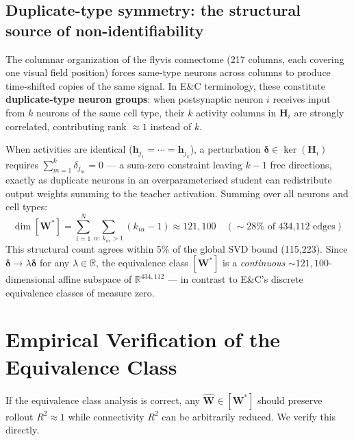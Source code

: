 \documentclass[11pt,a4paper]{article}
\begin{document}
\subsection{Duplicate-type symmetry: the structural source of non-identifiability}
\label{subsec:duplicate}

The columnar organization of the flyvis connectome (217 columns, each covering
one visual field position) forces same-type neurons across columns to produce
time-shifted copies of the same signal. In E\&C terminology, these constitute
\textbf{duplicate-type neuron groups}: when postsynaptic neuron $i$ receives
input from $k$ neurons of the same cell type, their $k$ activity columns in
$\mathbf{H}_i$ are strongly correlated, contributing rank $\approx 1$ instead of
$k$.

When activities are identical ($\mathbf{h}_{j_1} = \cdots = \mathbf{h}_{j_k}$), a
perturbation $\boldsymbol{\delta} \in \ker(\mathbf{H}_i)$ requires
$\sum_{m=1}^{k}\delta_{j_m} = 0$ --- a sum-zero constraint leaving $k-1$ free
directions, exactly as duplicate neurons in an overparameterised student can
redistribute output weights summing to the teacher activation. Summing over all
neurons and cell types:
\begin{equation}
\dim[\mathbf{W}^*] = \sum_{i=1}^{N} \sum_{\alpha:\,k_{i\alpha}>1} (k_{i\alpha}-1)
\approx 121{,}100 \quad (\sim 28\% \text{ of 434,112 edges})
\end{equation}
This structural count agrees within 5\% of the global SVD bound (115,223). Since
$\boldsymbol{\delta} \to \lambda\boldsymbol{\delta}$ for any $\lambda \in \mathbb{R}$,
the equivalence class $[\mathbf{W}^*]$ is a \emph{continuous}
$\sim 121{,}100$-dimensional affine subspace of $\mathbb{R}^{434{,}112}$ ---
in contrast to E\&C's discrete equivalence classes of measure zero.

\section{Empirical Verification of the Equivalence Class}

If the equivalence class analysis is correct, any $\hat{\mathbf{W}} \in
[\mathbf{W}^*]$ should preserve rollout $R^2 \approx 1$ while connectivity $R^2$
can be arbitrarily reduced. We verify this directly.
\end{document}
